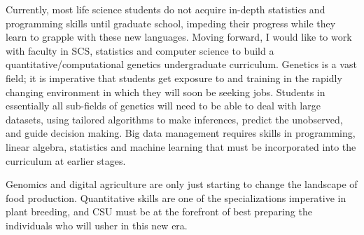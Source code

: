 \documentclass[11pt]{article}
\begin{document}
Currently, most life science students do not acquire in-depth statistics and programming skills until graduate school, impeding their progress while they learn to grapple with these new languages. Moving forward, I would like to work with faculty in SCS, statistics and computer science to build a quantitative/computational genetics undergraduate curriculum. Genetics is a vast field; it is imperative that students get exposure to and training in the rapidly changing environment in which they will soon be seeking jobs. Students in essentially all sub-fields of genetics will need to be able to deal with large datasets, using tailored algorithms to make inferences, predict the unobserved, and guide decision making. Big data management requires skills in programming, linear algebra, statistics and machine learning that must be incorporated into the curriculum at earlier stages.


Genomics and digital agriculture are only just starting to change the landscape of food production. Quantitative skills are one of the specializations imperative in plant breeding, and CSU must be at the forefront of best preparing the individuals who will usher in this new era.
\end{document}
